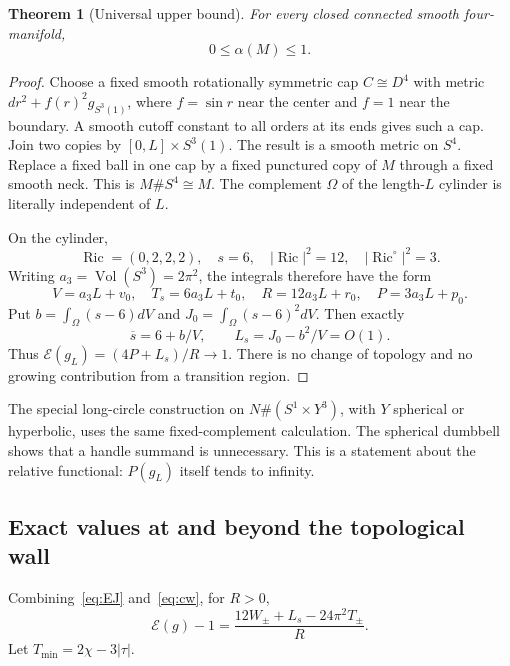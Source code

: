 \documentclass[11pt]{article}
\newcommand{\Ric}{\operatorname{Ric}}
\newcommand{\Vol}{\operatorname{Vol}}
\newcommand{\cE}{\mathcal E}
\newtheorem{theorem}{Theorem}[section]
\theoremstyle{definition}
\theoremstyle{remark}
\begin{document}
\begin{theorem}[Universal upper bound]
\label{thm:universal}
For every closed connected smooth four-manifold,
\begin{equation}
                    0\le\alpha(M)\le1.
 \label{eq:universal}
\end{equation}
\end{theorem}
\begin{proof}
Choose a fixed smooth rotationally symmetric cap $C\cong D^4$ with
metric $dr^2+f(r)^2g_{S^3(1)}$, where $f=\sin r$ near the center and
$f=1$ near the boundary. A smooth cutoff constant to all orders at its
ends gives such a cap. Join two copies by $[0,L]\times S^3(1)$.
The result is a smooth metric on $S^4$. Replace a fixed ball in one cap
by a fixed punctured copy of $M$ through a fixed smooth neck. This is
$M\#S^4\cong M$. The complement $\Omega$ of the length-$L$ cylinder
is literally independent of $L$.

On the cylinder,
\[
 \Ric=(0,2,2,2),\quad s=6,\quad
 |\Ric|^2=12,\quad |\Ric^\circ|^2=3.
\]
Writing $a_3=\Vol(S^3)=2\pi^2$, the integrals therefore have the form
\[
 V=a_3L+v_0,\quad T_s=6a_3L+t_0,\quad
 R=12a_3L+r_0,\quad P=3a_3L+p_0.
\]
Put $b=\int_\Omega(s-6)dV$ and $J_0=\int_\Omega(s-6)^2dV$.
Then exactly
\[
 \overline s=6+b/V,\qquad L_s=J_0-b^2/V=O(1).
\]
Thus $\cE(g_L)=(4P+L_s)/R\to1$. There is no change of topology and
no growing contribution from a transition region.
\end{proof}

The special long-circle construction on
$N\#(S^1\times Y^3)$, with $Y$ spherical or hyperbolic, uses the same
fixed-complement calculation. The spherical dumbbell shows that a handle
summand is unnecessary. This is a statement about the relative functional:
$P(g_L)$ itself tends to infinity.

\subsection{Exact values at and beyond the topological wall}

Combining~\eqref{eq:EJ} and~\eqref{eq:cw}, for $R>0$,
\begin{equation}
 \cE(g)-1=
 \frac{12W_\pm+L_s-24\pi^2T_\pm}{R}.
 \label{eq:unit-wall}
\end{equation}
Let $T_{\min}=2\chi-3|\tau|$.
\end{document}
